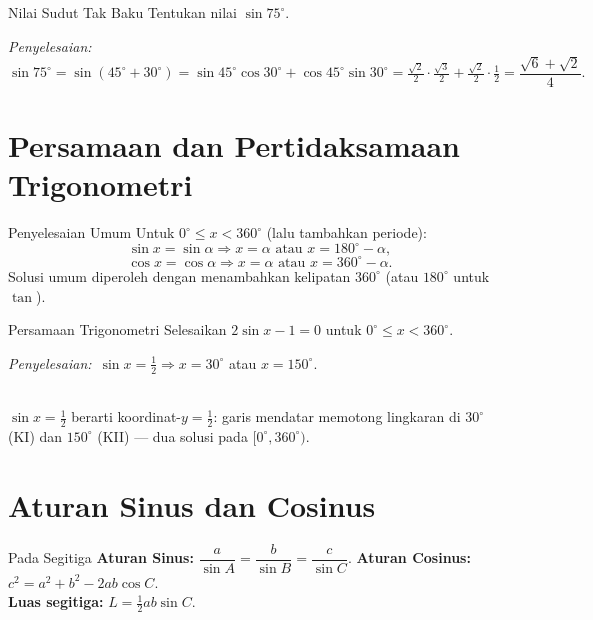 \documentclass[11pt,a4paper]{report}
\theoremstyle{gaya}
\newcommand{\jawab}{\par\smallskip\noindent\textit{\textcolor{oranye}{Penyelesaian:}}\ }
\begin{document}
\begin{contoh}{Nilai Sudut Tak Baku}
Tentukan nilai $\sin75^\circ$.

\jawab $\sin75^\circ=\sin(45^\circ+30^\circ)=\sin45^\circ\cos30^\circ+\cos45^\circ\sin30^\circ
=\tfrac{\sqrt2}{2}\cdot\tfrac{\sqrt3}{2}+\tfrac{\sqrt2}{2}\cdot\tfrac12=\dfrac{\sqrt6+\sqrt2}{4}.$
\end{contoh}

\section{Persamaan dan Pertidaksamaan Trigonometri}
\begin{konsep}{Penyelesaian Umum}
Untuk $0^\circ\le x<360^\circ$ (lalu tambahkan periode):
\[
\sin x=\sin\alpha \Rightarrow x=\alpha \text{ atau } x=180^\circ-\alpha,
\]
\[
\cos x=\cos\alpha \Rightarrow x=\alpha \text{ atau } x=360^\circ-\alpha.
\]
Solusi umum diperoleh dengan menambahkan kelipatan $360^\circ$ (atau $180^\circ$ untuk $\tan$).
\end{konsep}

\begin{contoh}{Persamaan Trigonometri}
Selesaikan $2\sin x-1=0$ untuk $0^\circ\le x<360^\circ$.

\jawab $\sin x=\tfrac12\Rightarrow x=30^\circ$ atau $x=150^\circ$.
\end{contoh}

\begin{center}
\\
\small $\sin x=\tfrac12$ berarti koordinat-$y=\tfrac12$: garis mendatar memotong lingkaran di $30^\circ$ (KI) dan $150^\circ$ (KII) --- dua solusi pada $[0^\circ,360^\circ)$.
\end{center}

\section{Aturan Sinus dan Cosinus}
\begin{konsep}{Pada Segitiga}
\textbf{Aturan Sinus:} $\dfrac{a}{\sin A} = \dfrac{b}{\sin B} = \dfrac{c}{\sin C}$.\qquad
\textbf{Aturan Cosinus:} $c^2 = a^2 + b^2 - 2ab\cos C$.\\
\textbf{Luas segitiga:} $L=\tfrac12 ab\sin C$.
\end{konsep}
\end{document}

